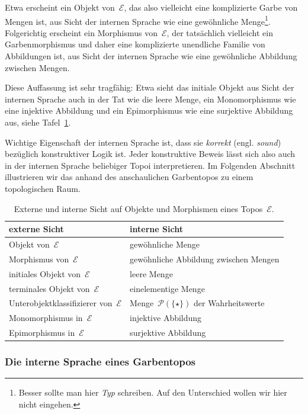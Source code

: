 \documentclass[a4paper,ngerman,12pt]{scrartcl}
\theoremstyle{definition}
\theoremstyle{plain}
\theoremstyle{remark}
\newcommand{\E}{\mathcal{E}}
\renewcommand{\P}{\mathcal{P}}
\renewcommand{\_}{\mathpunct{.}\,}
\newcommand{\?}{\,{:}\,}
\begin{document}
Etwa erscheint ein Objekt von~$\E$, das also vielleicht eine komplizierte Garbe
von Mengen ist, aus Sicht der internen Sprache wie eine gewöhnliche
Menge\footnote{Besser sollte man hier \emph{Typ} schreiben. Auf den
Unterschied wollen wir hier nicht eingehen.}. Folgerichtig erscheint ein
Morphismus von~$\E$, der tatsächlich vielleicht ein Garbenmorphismus und daher
eine komplizierte unendliche
Familie von Abbildungen ist, aus Sicht der internen Sprache wie eine
gewöhnliche Abbildung zwischen Mengen.

Diese Auffassung ist sehr tragfähig: Etwa sieht das initiale Objekt aus Sicht
der internen Sprache auch in der Tat wie die leere Menge, ein Monomorphismus
wie eine injektive Abbildung und ein Epimorphismus wie eine surjektive
Abbildung aus, siehe Tafel~\ref{tafel:externintern}.

Wichtige Eigenschaft der internen Sprache ist, dass sie \emph{korrekt} (engl.
\emph{sound}) bezüglich konstruktiver Logik ist. Jeder konstruktive Beweis
lässt sich also auch in der internen Sprache beliebiger Topoi interpretieren.
Im Folgenden Abschnitt illustrieren wir das anhand des anschaulichen
Garbentopos zu einem topologischen Raum.

\begin{table}
  \centering
  \small
  \begin{tabular}{@{}ll@{}}
    \toprule
    externe Sicht & interne Sicht
    \\\midrule
    Objekt von~$\E$ & gewöhnliche Menge \\
    Morphismus von~$\E$ & gewöhnliche Abbildung zwischen Mengen \\
    initiales Objekt von~$\E$ & leere Menge \\
    terminales Objekt von~$\E$ & einelementige Menge \\
    Unterobjektklassifizierer von~$\E$ & Menge~$\P(\{\star\})$ der
    Wahrheitswerte \\
    Monomorphismus in~$\E$ & injektive Abbildung \\
    Epimorphismus in~$\E$ & surjektive Abbildung \\
    \bottomrule
  \end{tabular}
  \caption{\label{tafel:externintern}Externe und interne Sicht auf Objekte und
  Morphismen eines Topos~$\E$.}
\end{table}


\subsubsection*{Die interne Sprache eines Garbentopos}
\end{document}

